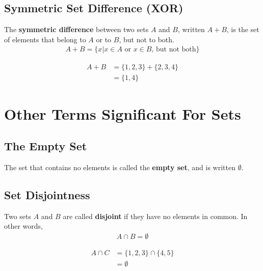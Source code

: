\documentclass[../notes.tex]{subfiles}
\begin{document}
      \subsection{Symmetric Set Difference (XOR)}
        The \textbf{symmetric difference} between two sets $A$ and $B$, written $A + B$, is the set of elements that belong to $A$ or to $B$, but not to both.
        \begin{align*}
          A + B = \biggl\{x | x \in A \text{ or } x \in B\text{, but not both}\biggr\}
        \end{align*}
        \begin{center}
        \end{center}
        \begin{examplebox}
          \begin{align*}
            A + B &= \{1, 2, 3\} + \{2, 3, 4\}\\
            &= \{1, 4\}
          \end{align*}
        \end{examplebox}
    \section{Other Terms Significant For Sets}
      \subsection{The Empty Set}
        The set that contains no elements is called the \textbf{empty set}, and is written $\emptyset$.
      \subsection{Set Disjointness}
        Two sets $A$ and $B$ are called \textbf{disjoint} if they have no elements in common. In other words,
        \begin{align*}
          A \cap B = \emptyset
        \end{align*}
        \begin{examplebox}
          \begin{align*}
            A \cap C &= \{1, 2, 3\} \cap \{4, 5\}\\
            &= \emptyset
          \end{align*}
        \end{examplebox}
\end{document}
